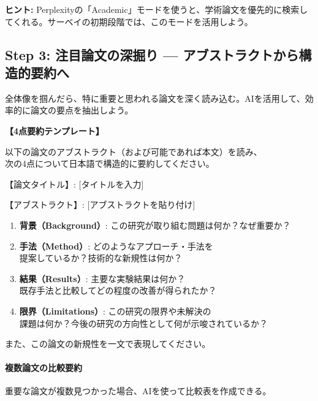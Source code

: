 \begin{screen}
\textbf{ヒント:} Perplexityの「Academic」モードを使うと、学術論文を優先的に検索してくれる。サーベイの初期段階では、このモードを活用しよう。
\end{screen}

\subsection{Step 3: 注目論文の深掘り --- アブストラクトから構造的要約へ}

全体像を掴んだら、特に重要と思われる論文を深く読み込む。AIを活用して、効率的に論文の要点を抽出しよう。

\begin{promptbox}
\textbf{【4点要約テンプレート】}

以下の論文のアブストラクト（および可能であれば本文）を読み、\\
次の4点について日本語で構造的に要約してください。

【論文タイトル】: [タイトルを入力]

【アブストラクト】: [アブストラクトを貼り付け]

\begin{enumerate}
\item \textbf{背景（Background）}: この研究が取り組む問題は何か？なぜ重要か？
\item \textbf{手法（Method）}: どのようなアプローチ・手法を\\
提案しているか？技術的な新規性は何か？
\item \textbf{結果（Results）}: 主要な実験結果は何か？\\
既存手法と比較してどの程度の改善が得られたか？
\item \textbf{限界（Limitations）}: この研究の限界や未解決の\\
課題は何か？今後の研究の方向性として何が示唆されているか？
\end{enumerate}

また、この論文の新規性を一文で表現してください。
\end{promptbox}

\paragraph{複数論文の比較要約}
重要な論文が複数見つかった場合、AIを使って比較表を作成できる。


